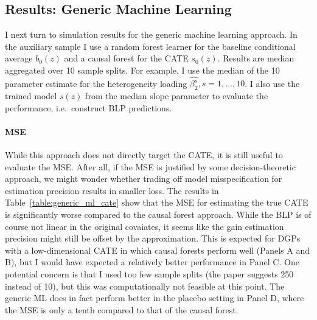 \documentclass[11pt, a4paper, leqno]{article}
\begin{document}
\subsection{Results: Generic Machine Learning}
I next turn to simulation results for the generic machine learning approach.
In the auxiliary sample I use a random forest learner for the baseline conditional average $b_0(z)$ and a causal forest for the CATE $s_0(z)$.
Results are median aggregated over 10 sample splits. For example, I use the median of the 10 parameter estimate for the heterogeneity loading $\hat{\beta_2^s}, s=1,\ldots,10$.
I also use the trained model $s(z)$ from the median slope parameter to evaluate the performance, i.e.\ construct BLP predictions.

\paragraph*{MSE}
While this approach does not directly target the CATE, it is still useful to evaluate the MSE\@.
After all, if the MSE is justified by some decision-theoretic approach, we might wonder whether trading off model misspecification for estimation precision results in smaller loss.
The results in Table~\ref*{table:generic_ml_cate} show that the MSE for estimating the true CATE is significantly worse compared to the causal forest approach.
While the BLP is of course not linear in the original covaiates, it seems like the gain estimation precision might still be offset by the approximation.
This is expected for DGPs with a low-dimensional CATE in which causal forests perform well (Panels A and B), but I would have expected a relatively better performance in Panel C.
One potential concern is that I used too few sample splits (the paper suggests 250 instead of 10), but this was computationally not feasible at this point.
The generic ML does in fact perform better in the placebo setting in Panel D, where the MSE is only a tenth compared to that of the causal forest.
\end{document}
